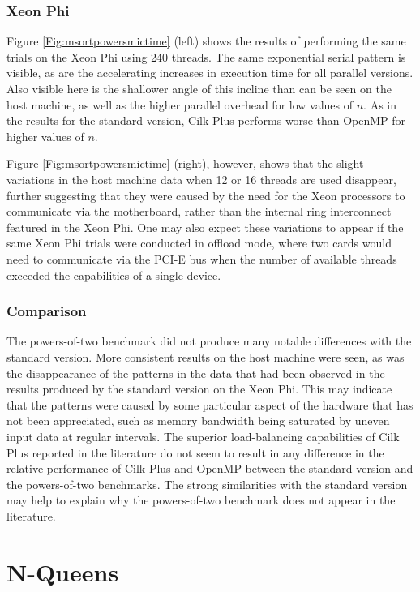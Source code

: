 \documentclass{report}
\begin{document}
\subsubsection{Xeon Phi}

Figure \ref{Fig:msortpowersmictime} (left) shows the results of performing the same trials on the Xeon Phi using 240 threads. The same exponential serial pattern is visible, as are the accelerating increases in execution time for all parallel versions. Also visible here is the shallower angle of this incline than can be seen on the host machine, as well as the higher parallel overhead for low values of \(n\). As in the results for the standard version, Cilk Plus performs worse than OpenMP for higher values of \(n\).

Figure \ref{Fig:msortpowersmictime} (right), however, shows that the slight variations in the host machine data when 12 or 16 threads are used disappear, further suggesting that they were caused by the need for the Xeon processors to communicate via the motherboard, rather than the internal ring interconnect featured in the Xeon Phi. One may also expect these variations to appear if the same Xeon Phi trials were conducted in offload mode, where two cards would need to communicate via the PCI-E bus when the number of available threads exceeded the capabilities of a single device.

\subsubsection{Comparison}

The powers-of-two benchmark did not produce many notable differences with the standard version. More consistent results on the host machine were seen, as was the disappearance of the patterns in the data that had been observed in the results produced by the standard version on the Xeon Phi. This may indicate that the patterns were caused by some particular aspect of the hardware that has not been appreciated, such as memory bandwidth being saturated by uneven input data at regular intervals. The superior load-balancing capabilities of Cilk Plus reported in the literature do not seem to result in any difference in the relative performance of Cilk Plus and OpenMP between the standard version and the powers-of-two benchmarks. The strong similarities with the standard version may help to explain why the powers-of-two benchmark does not appear in the literature.

\section{N-Queens} \label{Sec:evalnqueens}
\end{document}

